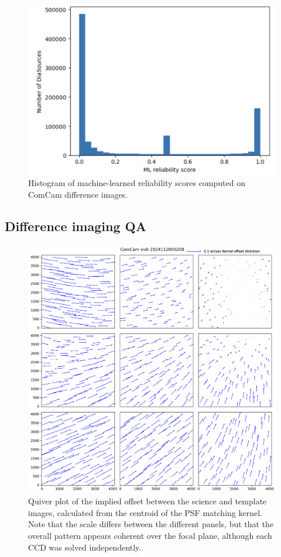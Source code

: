 \begin{figure}
\includegraphics[width=\textwidth]{dia/figures/reliability_histogram.png}
\caption{Histogram of machine-learned reliability scores computed on ComCam difference images. \label{fig:reliability_hist}}
\end{figure}

\subsection{Difference imaging QA}

\begin{figure}
\includegraphics[width=\textwidth]{dia/figures/ComCam_kernel_quiver_2024112000208.png}
\caption{Quiver plot of the implied offset between the science and template images,
  calculated from the centroid of the PSF matching kernel.
  Note that the scale differs between the different panels, but that the overall pattern
  appears coherent over the focal plane, although each CCD was solved independently.
  \label{fig:diffim-quiver}}
\end{figure}

